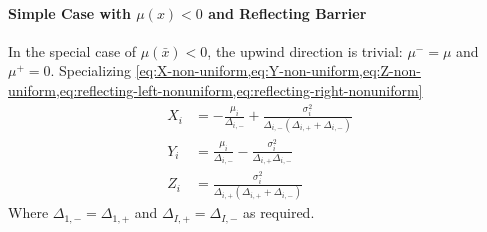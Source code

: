 \documentclass[11pt]{etk-article}
\begin{document}
\paragraph{Simple Case with $\mu(x) < 0$ and Reflecting Barrier}
In the special case of $\mu(\bar{x}) < 0$, the upwind direction is trivial: $\mu^{-} = \mu$ and $\mu^{+} = 0$.  Specializing \cref{eq:X-non-uniform,eq:Y-non-uniform,eq:Z-non-uniform,eq:reflecting-left-nonuniform,eq:reflecting-right-nonuniform}
\begin{align}
	X_i &= - \frac{\mu_i}{\Delta_{i,-}}+ \frac{\sigma_i^{2}}{\Delta_{i,-}(\Delta_{i,+}+\Delta_{i,-})}\label{eq:X-non-uniform-backwards} \\
	Y_i &= \frac{\mu_i}{\Delta_{i,-}} - \frac{\sigma_i^{2}}{\Delta_{i,+}\Delta_{i,-}}\label{eq:Y-non-uniform-backwards} \\
	Z_i &= \frac{\sigma_i^{2}}{\Delta_{i,+}(\Delta_{i,+}+\Delta_{i,-})}\label{eq:Z-non-uniform-backwards}
\end{align}
Where $\Delta_{1,-} = \Delta_{1,+}$ and $\Delta_{I,+} = \Delta_{I,-}$ as required.
\end{document}
